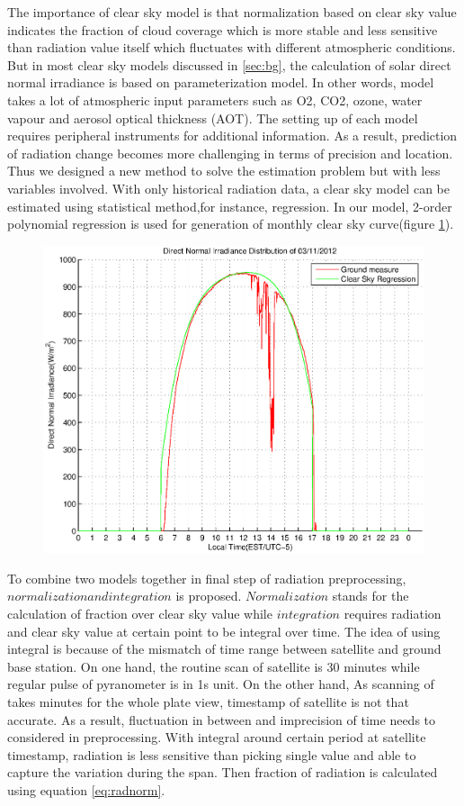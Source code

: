 \documentclass[conference]{IEEEtran}
\begin{document}
The importance of clear sky model is that normalization based on clear sky value
indicates the fraction of cloud coverage which is more stable and less
sensitive than radiation value itself which fluctuates with different
atmospheric conditions. But in most clear sky models discussed in \ref{sec:bg},
the calculation of solar direct normal irradiance is based on parameterization
model. In other words, model takes a lot of atmospheric input
parameters such as O2, CO2, ozone, water vapour and aerosol optical thickness
(AOT). The setting up of each model requires peripheral instruments for
additional information. As a result, prediction of radiation change becomes more
challenging in terms of precision and location. Thus we designed a new method
to solve the estimation problem but with less variables involved. With only
historical radiation data, a clear sky model can be estimated using statistical
method,for instance, regression. In our model, 2-order
polynomial regression is used for generation of monthly clear sky curve(figure
\ref{fig:csfig}).


\begin{figure}[tb]
\centering
\includegraphics[width=3 in]{csfit}
\label{fig:csfig}
\end{figure}

To combine two models together in final step of radiation preprocessing,
$normalization and integration$ is proposed. $Normalization$ stands for the
calculation of fraction over clear sky value while $integration$
requires radiation and clear sky value at certain point to be
integral over time. The idea of using integral is because of the mismatch of
time range between satellite and ground base station. On one hand, the routine
scan of satellite is 30 minutes while regular pulse of pyranometer is in 1s
unit. On the other hand, As scanning of takes minutes for the whole plate view,
timestamp of satellite is not that accurate. As a result, fluctuation in
between and imprecision of time needs to considered in preprocessing. With
integral around certain period at satellite timestamp, radiation is less
sensitive than picking single value and able to capture the variation during the
span. Then fraction of radiation is calculated using equation \ref{eq:radnorm}.
\end{document}
